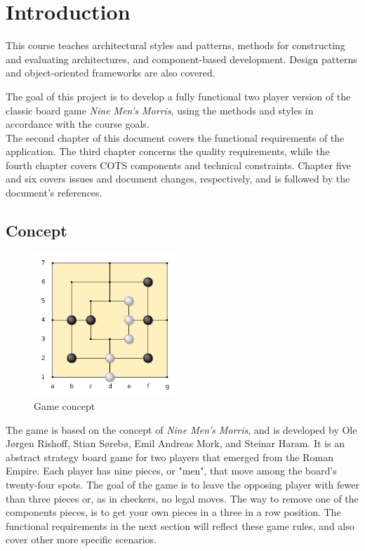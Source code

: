 \section{Introduction}
This course teaches architectural styles and patterns, methods for constructing and evaluating architectures, and component-based development. Design patterns and object-oriented frameworks are also covered.

The goal of this project is to develop a fully functional two player version of the classic board game \emph{Nine Men's Morris}, using the methods and styles in accordance with the course goals. \\

The second chapter of this document covers the functional requirements of the application. The third chapter concerns the quality requirements, while the fourth chapter covers COTS components and technical constraints. Chapter five and six covers issues and document changes, respectively, and is followed by the document's references.



\subsection{Concept}

\begin{figure}
  \begin{center}
  \vspace{-32pt}
    \includegraphics[width=0.48\textwidth]{concept2.png}
  \end{center}
  \vspace{-20pt}
  \caption{Game concept}
  \vspace{1pt}
\end{figure}

The game is based on the concept of \emph{Nine Men's Morris}, and is developed by Ole Jørgen Rishoff, Stian Sørebø, Emil Andreas Mork, and Steinar Haram. It is an abstract strategy board game for two players that emerged from the Roman Empire. Each player has nine pieces, or "men", that move among the board's twenty-four spots. The goal of the game is to leave the opposing player with fewer than three pieces or, as in checkers, no legal moves. The way to remove one of the components pieces, is to get your own pieces in a three in a row position. The functional requirements in the next section will reflect these game rules, and also cover other more specific scenarios. 



